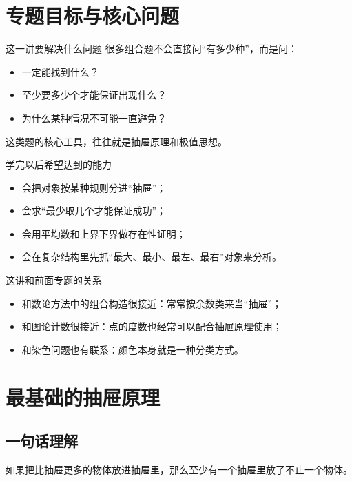 \documentclass[11pt,a4paper,fontset=fandol]{ctexart}
\theoremstyle{formaltheorem}
\theoremstyle{formalexample}
\begin{document}
\pagestyle{plain}
\tableofcontents
\newpage
\pagestyle{fancy}

\section{专题目标与核心问题}

\begin{goalbox}{这一讲要解决什么问题}
很多组合题不会直接问“有多少种”，而是问：
\begin{itemize}
  \item 一定能找到什么？
  \item 至少要多少个才能保证出现什么？
  \item 为什么某种情况不可能一直避免？
\end{itemize}

这类题的核心工具，往往就是抽屉原理和极值思想。
\end{goalbox}

\begin{goalbox}{学完以后希望达到的能力}
\begin{itemize}
  \item 会把对象按某种规则分进“抽屉”；
  \item 会求“最少取几个才能保证成功”；
  \item 会用平均数和上界下界做存在性证明；
  \item 会在复杂结构里先抓“最大、最小、最左、最右”对象来分析。
\end{itemize}
\end{goalbox}

\begin{notebox}{这讲和前面专题的关系}
\begin{itemize}
  \item 和数论方法中的组合构造很接近：常常按余数类来当“抽屉”；
  \item 和图论计数很接近：点的度数也经常可以配合抽屉原理使用；
  \item 和染色问题也有联系：颜色本身就是一种分类方式。
\end{itemize}
\end{notebox}

\section{最基础的抽屉原理}

\subsection{一句话理解}
如果把比抽屉更多的物体放进抽屉里，那么至少有一个抽屉里放了不止一个物体。
\end{document}
